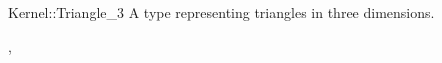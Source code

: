 \begin{ccRefConcept}{Kernel::Triangle_3}
A type representing triangles in three dimensions.

\ccRefines
{},

\ccSeeAlso
{}

\end{ccRefConcept}
